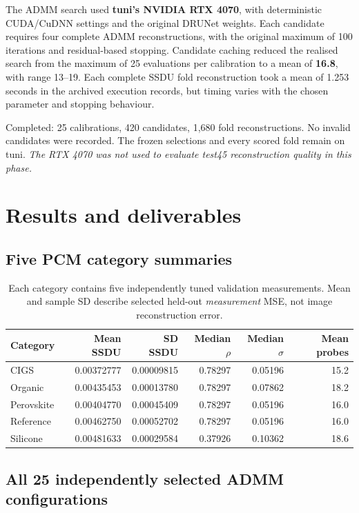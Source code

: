 \documentclass[10pt,a4paper]{article}
\begin{document}
The ADMM search used \textbf{tuni's NVIDIA RTX 4070}, with
deterministic CUDA/CuDNN settings and the original DRUNet weights.
Each candidate requires four complete ADMM reconstructions, with
the original maximum of 100 iterations and residual-based stopping.
Candidate caching reduced the realised search from the maximum of
25 evaluations per calibration to a mean of
\textbf{16.8}, with range 13--19.
Each complete SSDU fold reconstruction took a mean of
1.253 seconds in the archived execution records,
but timing varies with the chosen parameter and stopping behaviour.

Completed: 25 calibrations, 420 candidates, 1,680 fold
reconstructions. No invalid candidates were recorded.
The frozen selections and every scored fold remain on tuni.
\emph{The RTX 4070 was not used to evaluate test45 reconstruction
quality in this phase.}

\section{Results and deliverables}

\subsection*{Five PCM category summaries}

\begin{table}[htbp]
\centering\small
\begin{tabular}{@{}lrrrrr@{}}
\toprule
Category & Mean SSDU & SD SSDU & Median $\rho$ & Median $\sigma$ & Mean probes\\
\midrule
CIGS & 0.00372777 & 0.00009815 & 0.78297 & 0.05196 & 15.2 \\
Organic & 0.00435453 & 0.00013780 & 0.78297 & 0.07862 & 18.2 \\
Perovskite & 0.00404770 & 0.00045409 & 0.78297 & 0.05196 & 16.0 \\
Reference & 0.00462750 & 0.00052702 & 0.78297 & 0.05196 & 16.0 \\
Silicone & 0.00481633 & 0.00029584 & 0.37926 & 0.10362 & 18.6 \\
\bottomrule
\end{tabular}
\caption{Each category contains five independently tuned validation
measurements. Mean and sample SD describe selected held-out
\emph{measurement} MSE, not image reconstruction error.}
\end{table}

\subsection*{All 25 independently selected ADMM configurations}
\end{document}
